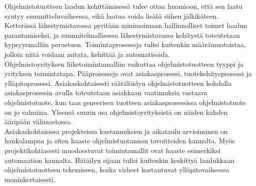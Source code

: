 \documentclass[finnish,12pt,a4paper,pdftex]{article}
\begin{document}
\noindent Ohjelmistotuotteen laadun kehittämisessä tulee ottaa huomioon, että sen laatu syntyy suunnitteluvaiheessa, eikä laatua voida lisätä siihen jälkikäteen. Ketterässä lähestymistavassa pyritään minimoimaan hallinnolliset toimet laadun parantamiseksi, ja suunnitelmallisessa lähestymistavassa kehitystä toteutetaan kypsyysmalliin perustuen. Toimintaprosesseja tulisi kuitenkin määrämuotoistaa, jolloin niitä voidaan mitata, kehittää ja automatisoida. \\

\noindent Ohjelmistoyrityksen liiketoimintamalliin vaikuttaa ohjelmistotuotteen tyyppi ja yrityksen toimintatapa. Pääprosesseja ovat asiakasprosessi, tuotekehitysprosessi ja ylläpitoprosessi. Asiakaskohtaisesti räätälöidyn ohjelmistotuotteen kohdalla asiakasprosessin avulla toteutetaan asiakkaan vaatimuksia vastaava ohjelmistotuote, kun taas geneerisen tuotteen asiakasprosessissa ohjelmistotuote on jo valmiina. Yleensä suurin osa ohjelmistoyrityksistä on näiden kahden ääripään välimastossa.\\

\noindent Asiakaskohtaisissa projekteissa kustannuksien ja aikataulu arvioiminen on hankalampaa ja siten haaste ohjelmistuotannon tavoitteiden kannalta. Myös projektikohtiasesti muodosstuvat toimintamallit ovat haaste esimerkiksi automaation kannalta. Hätäilyn sijaan tulisi kuitenkin keskittyä laadukkaan ohjelmistotuotteen tekemiseen, koska virheet kostautuvat ylläpitovaiheessa moninkertaisesti.




\end{document}
